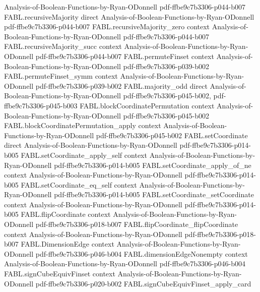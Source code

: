 \begin{theorem}
  {Analysis-of-Boolean-Functions-by-Ryan-ODonnell}
  {pdf-ffbe9c7b3306-p044-b007}
\proofstep
  {FABL.recursiveMajority}
  {direct}
  {Analysis-of-Boolean-Functions-by-Ryan-ODonnell}
  {pdf-ffbe9c7b3306-p044-b007}
\proofstep
  {FABL.recursiveMajority_zero}
  {context}
  {Analysis-of-Boolean-Functions-by-Ryan-ODonnell}
  {pdf-ffbe9c7b3306-p044-b007}
\proofstep
  {FABL.recursiveMajority_succ}
  {context}
  {Analysis-of-Boolean-Functions-by-Ryan-ODonnell}
  {pdf-ffbe9c7b3306-p044-b007}
\proofstep
  {FABL.permuteFinset}
  {context}
  {Analysis-of-Boolean-Functions-by-Ryan-ODonnell}
  {pdf-ffbe9c7b3306-p039-b002}
\proofstep
  {FABL.permuteFinset_symm}
  {context}
  {Analysis-of-Boolean-Functions-by-Ryan-ODonnell}
  {pdf-ffbe9c7b3306-p039-b002}
\proofstep
  {FABL.majority_odd}
  {direct}
  {Analysis-of-Boolean-Functions-by-Ryan-ODonnell}
  {pdf-ffbe9c7b3306-p045-b002,
    pdf-ffbe9c7b3306-p045-b003}
\proofstep
  {FABL.blockCoordinatePermutation}
  {context}
  {Analysis-of-Boolean-Functions-by-Ryan-ODonnell}
  {pdf-ffbe9c7b3306-p045-b002}
\proofstep
  {FABL.blockCoordinatePermutation_apply}
  {context}
  {Analysis-of-Boolean-Functions-by-Ryan-ODonnell}
  {pdf-ffbe9c7b3306-p045-b002}
\proofstep
  {FABL.setCoordinate}
  {direct}
  {Analysis-of-Boolean-Functions-by-Ryan-ODonnell}
  {pdf-ffbe9c7b3306-p014-b005}
\proofstep
  {FABL.setCoordinate_apply_self}
  {context}
  {Analysis-of-Boolean-Functions-by-Ryan-ODonnell}
  {pdf-ffbe9c7b3306-p014-b005}
\proofstep
  {FABL.setCoordinate_apply_of_ne}
  {context}
  {Analysis-of-Boolean-Functions-by-Ryan-ODonnell}
  {pdf-ffbe9c7b3306-p014-b005}
\proofstep
  {FABL.setCoordinate_eq_self}
  {context}
  {Analysis-of-Boolean-Functions-by-Ryan-ODonnell}
  {pdf-ffbe9c7b3306-p014-b005}
\proofstep
  {FABL.setCoordinate_setCoordinate}
  {context}
  {Analysis-of-Boolean-Functions-by-Ryan-ODonnell}
  {pdf-ffbe9c7b3306-p014-b005}
\proofstep
  {FABL.flipCoordinate}
  {context}
  {Analysis-of-Boolean-Functions-by-Ryan-ODonnell}
  {pdf-ffbe9c7b3306-p018-b007}
\proofstep
  {FABL.flipCoordinate_flipCoordinate}
  {context}
  {Analysis-of-Boolean-Functions-by-Ryan-ODonnell}
  {pdf-ffbe9c7b3306-p018-b007}
\proofstep
  {FABL.DimensionEdge}
  {context}
  {Analysis-of-Boolean-Functions-by-Ryan-ODonnell}
  {pdf-ffbe9c7b3306-p046-b004}
\proofstep
  {FABL.dimensionEdgeNonempty}
  {context}
  {Analysis-of-Boolean-Functions-by-Ryan-ODonnell}
  {pdf-ffbe9c7b3306-p046-b004}
\proofstep
  {FABL.signCubeEquivFinset}
  {context}
  {Analysis-of-Boolean-Functions-by-Ryan-ODonnell}
  {pdf-ffbe9c7b3306-p020-b002}
\proofstep
  {FABL.signCubeEquivFinset_apply_card}

\end{theorem}
